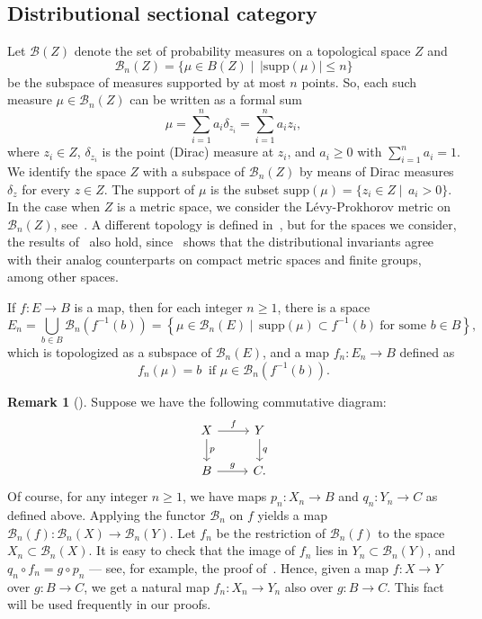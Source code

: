 \documentclass[10pt,a4paper]{amsart}
\let\scr\mathscr %
\theoremstyle{definition}
\newtheorem{remark}{Remark}
\def\B{{\scr B}}
\begin{document}
\subsection{Distributional sectional category}\label{sec:basic2}

Let $\B(Z)$ denote the set of probability measures on a topological space $Z$ and 
$$\B_n(Z) = \{\mu \in B(Z) \mid\, |\text{supp}(\mu)| \leq n\}$$ 
be the subspace of measures supported by at most $n$ points. So, each such measure $\mu\in\B_n(Z)$ 
can be written as a formal sum 
$$\mu = \sum_{i=1}^n a_i \delta_{z_i} = \sum_{i=1}^{n} a_i z_i,$$
where $z_i \in Z$, $\delta_{z_i}$ is the point (Dirac) measure at $z_i$, and 
$a_i \geq 0$ with $\sum_{i=1}^n a_i = 1$. We identify the space $Z$ with a 
subspace of $\B_n(Z)$ by means of Dirac measures $\delta_z$ for every $z \in Z$.
The support of $\mu$ is the subset $\text{supp}(\mu) = \{z_i\in Z\mid\, a_i > 0\}$. In the case when $Z$ is a metric space, we consider 
the L\'evy-Prokhorov metric on $\B_n(Z)$, see~\cite{Pr,DJ}. A different topology is defined 
in~\cite{KK,KW}, but for the spaces we consider, the results of~\cite{KW} also hold, since~\cite{KW2} shows that the distributional invariants agree with their analog counterparts on compact metric spaces and finite groups, among other spaces.

If $f\colon E \to B$ is a map, then for each integer $n\ge 1$, there is a space
\[
E_n = \bigcup_{b\in B}\B_n\left(f^{-1}(b)\right)=\left\{\mu \in \B_n(E)\mid\, \text{supp}(\mu) \subset f^{-1}(b)\ \text{for\ some\ } b \in B\right\},
\]
which is topologized as a subspace of $\B_n(E)$, and a map $f_n\colon E_n \to B$ defined as
\[
f_n(\mu) = b \ \text{ if } \mu\in\B_n\left(f^{-1}(b)\right).
\]


\begin{remark}[]\label{rem:naturality}
    Suppose we have the following commutative diagram:
\[
\begin{tikzcd}
    X \arrow{r}{f}  \arrow{d}{p}
    &
    Y \arrow{d}{q}
    \\
    B \arrow{r}{g}
    &
    C.
\end{tikzcd}
\]
Of course, for any integer $n\ge 1$, we have maps $p_n\colon X_n\to B$ and $q_n\colon Y_n\to C$ as defined above. Applying the functor $\B_n$ on $f$ yields a map $\B_n(f)\colon \B_n(X)\to \B_n(Y)$. Let $f_n$ be the restriction of $\B_n(f)$ to the space $X_n\subset \B_n(X)$. It is easy to check that the image of $f_n$ lies in $Y_n\subset \B_n(Y)$, and $q_n\circ f_n=g\circ p_n$ --- see, for example, the proof of~\cite[Proposition~5.3]{Ja1}. Hence, given a map $f\colon X\to Y$ over $g\colon B\to C$, we get a natural map $f_n\colon X_n\to Y_n$ also over $g\colon B\to C$. This fact will be used frequently in our proofs.
\end{remark}
\end{document}
